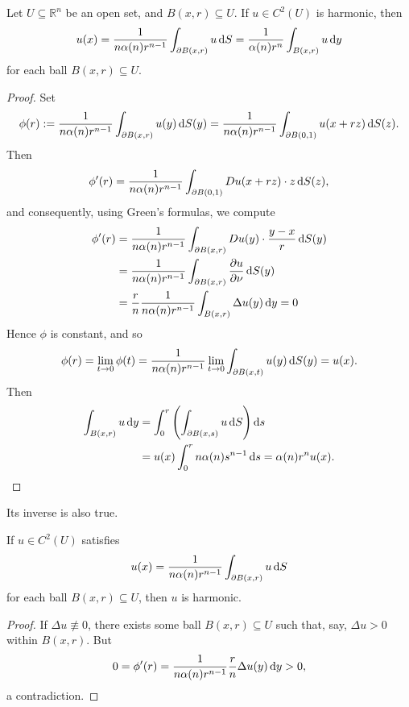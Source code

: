 \begin{theorem}
  \label{theorem-mean-value-formula-for-Laplace-equation}
  Let \( U \subseteq \mathbb{R}^n \) be an open set, and \( B(x, r) \subseteq U \).
  If \( u \in C^2(U) \) is harmonic, then
  \begin{equation}
    u(x) = \frac{1}{n \alpha(n) r^{n - 1}}\int_{\partial B(x, r)} u \mathop{}\!\mathrm{d} S = \frac{1}{\alpha(n)r^n} \int_{B(x, r)} u \mathop{}\!\mathrm{d} y
    \label{equation-mean-value-formula-for-Laplace-equation}
  \end{equation}
  for each ball \( B(x, r) \subseteq U \).
\end{theorem}
\begin{proof}
  Set
  \[
    \phi(r) := \frac{1}{n \alpha(n) r^{n - 1}}\int_{\partial B(x, r)} u(y) \mathop{}\!\mathrm{d} S(y) = \frac{1}{n \alpha(n) r^{n - 1}}\int_{\partial B(0, 1)} u(x + rz) \mathop{}\!\mathrm{d} S(z).
  \]
  Then
  \[
    \phi'(r) = \frac{1}{n \alpha(n) r^{n - 1}}\int_{\partial B(0, 1)} D u(x + rz) \cdot z \mathop{}\!\mathrm{d} S(z),
  \]
  and consequently, using Green's formulas, we compute
  \begin{align*}
    \phi'(r) &= \frac{1}{n\alpha(n)r^{n - 1}}\int_{\partial B(x, r)} D u(y) \cdot \frac{y - x}{r} \mathop{}\!\mathrm{d} S(y)\\
             &= \frac{1}{n\alpha(n)r^{n - 1}}\int_{\partial B(x, r)}\frac{\partial u}{\partial \nu}\mathop{}\!\mathrm{d} S(y)\\
             &= \frac{r}{n} \frac{1}{n\alpha(n)r^{n - 1}} \int_{B(x, r)} \Delta u(y) \mathop{}\!\mathrm{d} y = 0
  \end{align*}
  Hence \( \phi \) is constant, and so
  \[
    \phi(r) = \lim\limits_{t \to 0} \phi(t) = \frac{1}{n\alpha(n)r^{n - 1}}\lim\limits_{t \to 0}\int_{\partial B(x, t)} u(y) \mathop{}\!\mathrm{d} S(y) = u(x).
  \]
  Then
  \begin{align*}
    \int_{B(x, r)} u \mathop{}\!\mathrm{d} y &= \int_0^r \left( \int_{\partial B(x, s)} u \mathop{}\!\mathrm{d} S \right)\mathop{}\!\mathrm{d} s\\
                            &= u(x) \int_0^r n \alpha(n) s^{n - 1} \mathop{}\!\mathrm{d} s = \alpha(n) r^n u(x).
  \end{align*}
\end{proof}
Its inverse is also true.
\begin{theorem}
  \label{theorem-converse-to-mean-value-property}
  If \( u \in C^2(U) \) satisfies
  \[
    u(x) = \frac{1}{n \alpha(n) r^{n - 1}} \int_{\partial B(x, r)} u \mathop{}\!\mathrm{d} S
  \]
  for each ball \( B(x, r) \subseteq U \), then \( u \) is harmonic.
\end{theorem}
\begin{proof}
  If \( \Delta u \not\equiv 0 \), there exists some ball \( B(x, r) \subseteq U \) such that, say, \( \Delta u > 0 \) within \( B(x, r) \).
  But
  \[
    0 = \phi'(r) = \frac{1}{n \alpha(n) r^{n - 1}}\frac{r}{n}\Delta u(y) \mathop{}\!\mathrm{d} y > 0,
  \]
  a contradiction.
\end{proof}


